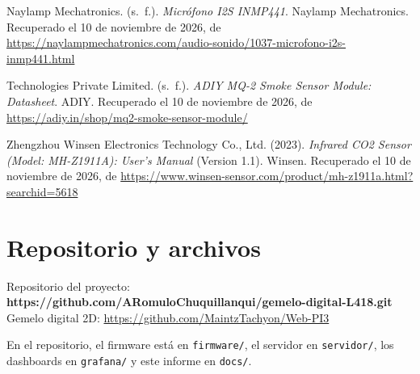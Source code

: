\documentclass[11pt,a4paper]{article}
\newcommand{\arch}[1]{\texttt{#1}}
\begin{document}
Naylamp Mechatronics. (s.\ f.). \emph{Micr\'ofono I2S INMP441}. Naylamp Mechatronics. Recuperado el 10 de noviembre de 2026, de \url{https://naylampmechatronics.com/audio-sonido/1037-microfono-i2s-inmp441.html}

Technologies Private Limited. (s.\ f.). \emph{ADIY MQ-2 Smoke Sensor Module: Datasheet}. ADIY. Recuperado el 10 de noviembre de 2026, de \url{https://adiy.in/shop/mq2-smoke-sensor-module/}

Zhengzhou Winsen Electronics Technology Co., Ltd. (2023). \emph{Infrared CO2 Sensor (Model: MH-Z1911A): User's Manual} (Version 1.1). Winsen. Recuperado el 10 de noviembre de 2026, de \url{https://www.winsen-sensor.com/product/mh-z1911a.html?searchid=5618}

\setlength{\parindent}{0pt}\setlength{\leftskip}{0pt}

\appendix
\section{Repositorio y archivos}

Repositorio del proyecto: \textbf{https://github.com/ARomuloChuquillanqui/gemelo-digital-L418.git}\\
Gemelo digital 2D: \url{https://github.com/MaintzTachyon/Web-PI3}

En el repositorio, el firmware est\'a en \arch{firmware/}, el servidor en \arch{servidor/}, los
dashboards en \arch{grafana/} y este informe en \arch{docs/}.
\end{document}
